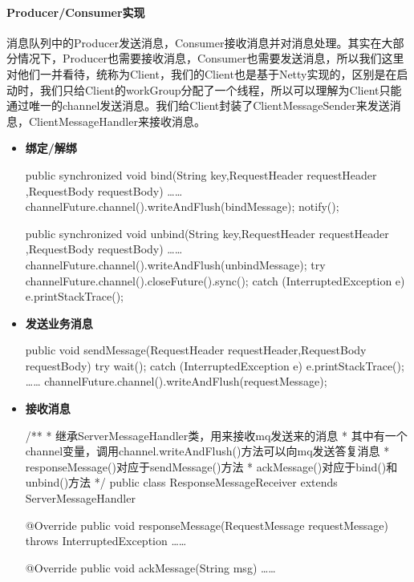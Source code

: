 \documentclass[a4paper]{article}
\theoremstyle{definition}
\begin{document}
\paragraph{Producer/Consumer实现}
消息队列中的Producer发送消息，Consumer接收消息并对消息处理。其实在大部分情况下，Producer也需要接收消息，Consumer也需要发送消息，所以我们这里对他们一并看待，统称为Client，我们的Client也是基于Netty实现的，区别是在启动时，我们只给Client的workGroup分配了一个线程，所以可以理解为Client只能通过唯一的channel发送消息。我们给Client封装了ClientMessageSender来发送消息，ClientMessageHandler来接收消息。
\begin{itemize}
    \item {\textbf{绑定/解绑}}\\
\begin{scala}
    public synchronized void bind(String key,RequestHeader requestHeader
                          ,RequestBody requestBody){
           ……
           channelFuture.channel().writeAndFlush(bindMessage);
           notify();
    }

    public synchronized void unbind(String key,RequestHeader requestHeader
                            ,RequestBody requestBody){
           ……
           channelFuture.channel().writeAndFlush(unbindMessage);
           try {
                channelFuture.channel().closeFuture().sync();
           } catch (InterruptedException e) {
                e.printStackTrace();
           }
    }
\end{scala}
    \item {\textbf{发送业务消息}}\\
\begin{scala}
    public void sendMessage(RequestHeader requestHeader,RequestBody requestBody){
        try {
           wait();
        } catch (InterruptedException e) {
           e.printStackTrace();
        }
        ……
        channelFuture.channel().writeAndFlush(requestMessage);
    }
\end{scala}
    \item {\textbf{接收消息}}\\
\begin{scala}
  /**
   * 继承ServerMessageHandler类，用来接收mq发送来的消息
   * 其中有一个channel变量，调用channel.writeAndFlush()方法可以向mq发送答复消息
   * responseMessage()对应于sendMessage()方法
   * ackMessage()对应于bind()和unbind()方法
   */
   public class ResponseMessageReceiver extends ServerMessageHandler {
    @Override
    public void responseMessage(RequestMessage requestMessage) throws InterruptedException {
       ……
    }

    @Override
    public void ackMessage(String msg) {
        ……
    }
}
\end{scala}
\end{itemize}
\end{document}
